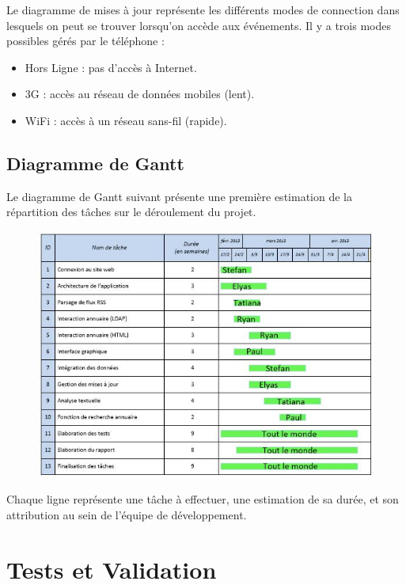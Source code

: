 \documentclass [pdftex,12pt] {report}
\begin{document}
Le diagramme de mises à jour représente les différents modes de connection dans lesquels on peut se trouver lorsqu'on accède aux événements. Il y a trois modes possibles gérés par le téléphone :\\
\begin{itemize}
\renewcommand{\labelitemi}{$\bullet$}
 \item Hors Ligne : pas d'accès à Internet.
 \item 3G :  accès au réseau de données mobiles (lent).
 \item WiFi : accès à un réseau sans-fil (rapide).
\end{itemize}

\newpage

\section{Diagramme de Gantt}
Le diagramme de Gantt suivant présente une première estimation de la répartition des tâches sur le déroulement du projet.

\begin{figure}[h]
  \center
  \includegraphics[width=1.0\textwidth]{resources/gantt.jpg}
\end{figure}

Chaque ligne représente une tâche à effectuer, une estimation de sa durée, et son attribution au sein de l'équipe de développement. \\


\chapter{Tests et Validation}
  
\end{document}
